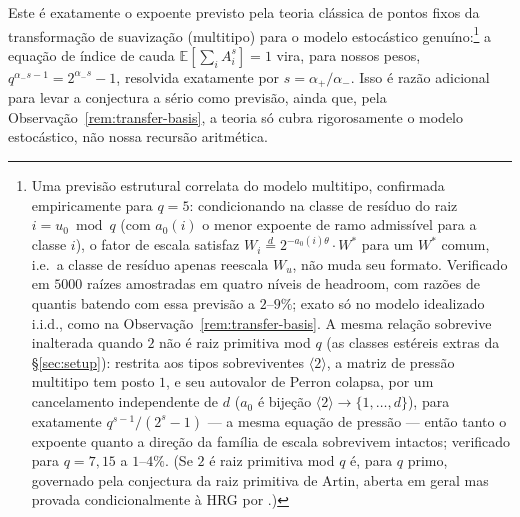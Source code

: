 \documentclass[11pt]{article}
\theoremstyle{definition}
\theoremstyle{remark}
\begin{document}
Este é exatamente o expoente previsto pela teoria clássica de pontos
fixos da transformação de suavização (multitipo)
\cite{Guivarch1990,Liu2000,Mentemeier2016} para o modelo estocástico
genuíno:\footnote{Uma previsão estrutural correlata do modelo
multitipo, confirmada empiricamente para $q=5$: condicionando na
classe de resíduo do raiz $i=u_0\bmod q$ (com $a_0(i)$ o menor
expoente de ramo admissível para a classe $i$), o fator de escala
satisfaz $W_i\stackrel{d}{=}2^{-a_0(i)\theta}\cdot W^*$ para um $W^*$
comum, i.e.\ a classe de resíduo apenas reescala $W_u$, não muda seu
formato. Verificado em $5000$ raízes amostradas em quatro níveis de
headroom, com razões de quantis batendo com essa previsão a
$2$--$9\%$; exato só no modelo idealizado i.i.d., como na
Observação~\ref{rem:transfer-basis}. A mesma relação sobrevive
inalterada quando $2$ não é raiz primitiva mod $q$ (as classes
estéreis extras da \S\ref{sec:setup}): restrita aos tipos
sobreviventes $\langle2\rangle$, a matriz de pressão multitipo tem
posto $1$, e seu autovalor de Perron colapsa, por um cancelamento
independente de $d$ ($a_0$ é bijeção $\langle2\rangle\to\{1,\ldots,
d\}$), para exatamente $q^{s-1}/(2^s-1)$ --- a mesma equação de
pressão --- então tanto o expoente quanto a direção da família de
escala sobrevivem intactos; verificado para $q=7,15$ a $1$--$4\%$.
(Se $2$ é raiz primitiva mod $q$ é, para $q$ primo, governado pela
conjectura da raiz primitiva de Artin, aberta em geral mas provada
condicionalmente à HRG por \cite{Hooley1967}.)}
a equação de índice de cauda $\mathbb{E}[\sum_i A_i^s]=1$
vira, para nossos pesos, $q^{\alpha_-s-1}=2^{\alpha_- s}-1$, resolvida
exatamente por $s=\alpha_+/\alpha_-$. Isso é razão adicional para levar
a conjectura a sério como previsão, ainda que, pela
Observação~\ref{rem:transfer-basis}, a teoria só cubra rigorosamente o
modelo estocástico, não nossa recursão aritmética.
\end{document}
